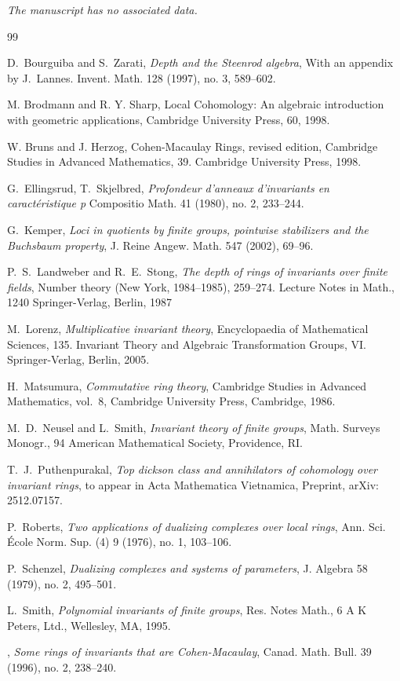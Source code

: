 \documentclass{amsart}
\theoremstyle{plain}
\theoremstyle{definition}
\theoremstyle{remark}
\begin{document}
\emph{The manuscript has no associated data.}
\begin{thebibliography} {99}

D.~Bourguiba and S.~Zarati,
\emph{Depth and the Steenrod algebra},
With an appendix by J.~Lannes.
Invent. Math. 128 (1997), no. 3, 589--602.

  M. Brodmann and R. Y. Sharp,
Local Cohomology: An algebraic introduction with geometric applications,
Cambridge University Press, 60, 1998.




  W. Bruns and J. Herzog,
Cohen-Macaulay Rings, revised edition,
Cambridge Studies in Advanced Mathematics, 39.
Cambridge University Press, 1998.

 G.~Ellingsrud, T.~Skjelbred,
 \emph{Profondeur d'anneaux d'invariants en caract\'{e}ristique p} 
  Compositio Math. 41 (1980), no. 2, 233--244.

 G.~Kemper,
\emph{Loci in quotients by finite groups, pointwise stabilizers and the Buchsbaum property},
J. Reine Angew. Math. 547 (2002), 69--96.

P.~S.~Landweber and R.~E.~Stong,
\emph{The depth of rings of invariants over finite fields},
Number theory (New York, 1984–1985), 259--274.
Lecture Notes in Math., 1240
Springer-Verlag, Berlin, 1987


 M.~Lorenz,
 \emph{Multiplicative invariant theory},
  Encyclopaedia of Mathematical Sciences, 135. Invariant Theory and Algebraic Transformation Groups, VI. Springer-Verlag, Berlin, 2005.

H.~Matsumura, \emph{Commutative ring theory}, Cambridge Studies in Advanced
  Mathematics, vol.~8, Cambridge University Press, Cambridge, 1986.

 M.~D.~Neusel and L.~Smith,
   \emph{Invariant theory of finite groups},
Math. Surveys Monogr., 94
American Mathematical Society, Providence, RI.

T.~J.~Puthenpurakal,
\emph{Top dickson class and annihilators of cohomology over invariant rings},
to appear in Acta Mathematica Vietnamica, Preprint, arXiv: 2512.07157.

P.~Roberts,
\emph{Two applications of dualizing complexes over local rings},
Ann. Sci. École Norm. Sup. (4) 9 (1976), no. 1, 103--106.

P.~Schenzel,
\emph{Dualizing complexes and systems of parameters},
J. Algebra 58 (1979), no. 2, 495--501.


L.~Smith,
\emph{Polynomial invariants of finite groups},
Res. Notes Math., 6
A K Peters, Ltd., Wellesley, MA, 1995.


\bysame,
\emph{Some rings of invariants that are Cohen-Macaulay},
Canad. Math. Bull. 39 (1996), no. 2, 238--240.




\end{thebibliography}
\end{document}
